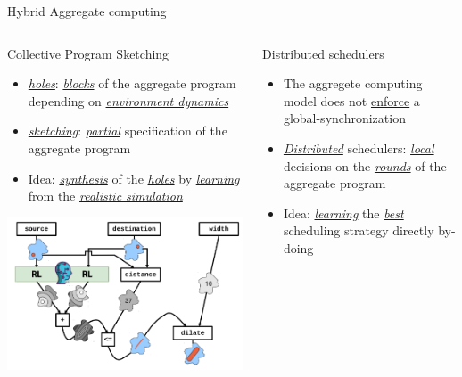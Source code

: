 \documentclass[presentation, 9pt, aspectratio=169]{beamer}\mode<presentation>{\usetheme{AMSBolognaFC}}
\begin{document}
\begin{frame}{Hybrid Aggregate computing}
\begin{columns}[t]
\begin{column}{0.31\textwidth}
\begin{exampleblock}{Collective Program Sketching~\cite{DBLP:conf/coordination/AguzziCV22}}
  \footnotesize{
  \begin{itemize}
    \item \emph{\underline{holes}}: \emph{\underline{blocks}} of the aggregate program depending on \emph{\underline{environment dynamics}}
    \item \emph{\underline{sketching}}: \emph{\underline{partial}} specification of the aggregate program
    \item Idea: \emph{\underline{synthesis}} of the \emph{\underline{holes}} by \emph{\underline{learning}} from the \emph{\underline{realistic simulation}}
  \end{itemize}}
  \includegraphics[width=\textwidth]{img/synthesis-3.png}
\end{exampleblock}
\end{column}
\begin{column}{0.31\textwidth}
\begin{exampleblock}{Distributed schedulers~\cite{DBLP:conf/acsos/AguzziCV22}}
  \footnotesize{
  \begin{itemize}
    \item The aggregete computing model does not \underline{enforce} a global-synchronization
    \item \emph{\underline{Distributed}} schedulers: \emph{\underline{local}} decisions on the \emph{\underline{rounds}} of the aggregate program
    \item Idea: \emph{\underline{learning}} the \emph{\underline{best}} scheduling strategy directly by-doing

\end{itemize}}
\end{exampleblock}
\end{column}
\end{columns}
\end{frame}
\end{document}

